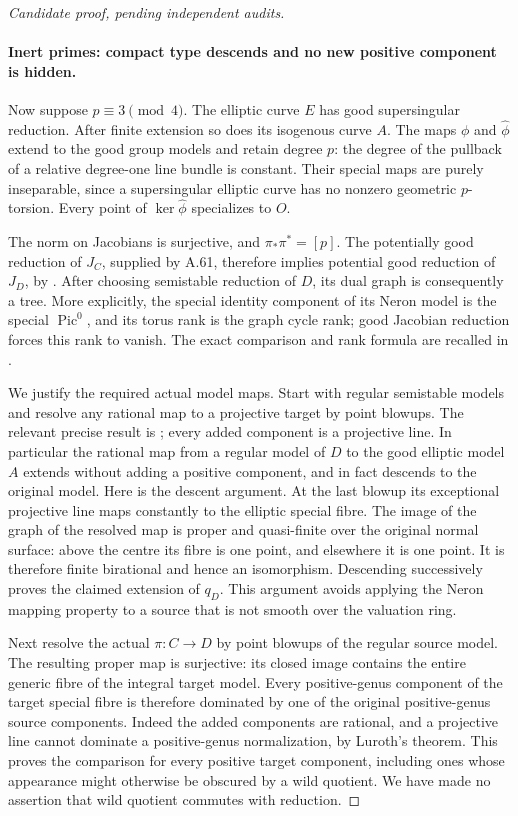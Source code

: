 \begin{proof}[Candidate proof, pending independent audits]
\paragraph{Inert primes: compact type descends and no new positive component is hidden.}
Now suppose \(p\equiv3\pmod4\). The elliptic
curve \(E\) has good supersingular reduction.
After finite extension so does its isogenous
curve \(A\). The maps \(\phi\) and
\(\widehat\phi\) extend to the good group
models and retain degree \(p\): the degree
of the pullback of a relative degree-one
line bundle is constant. Their special maps
are purely inseparable, since a supersingular
elliptic curve has no nonzero geometric
\(p\)-torsion. Every point of
\(\ker\widehat\phi\) specializes to \(O\).

The norm on Jacobians is surjective, and
\(\pi_*\pi^*=[p]\). The potentially good
reduction of \(J_C\), supplied by A.61,
therefore implies potential good reduction
of \(J_D\), by
\cite[Theorem 1 and Corollary 2, p.493]{fghSerreTate1968}.
After choosing semistable reduction of \(D\),
its dual graph is consequently a tree. More
explicitly, the special identity component
of its Neron model is the special \(\operatorname{Pic}^0\),
and its torus rank is the graph cycle rank;
good Jacobian reduction forces this rank to
vanish. The exact comparison and rank formula
are recalled in \cite[Remark 10.4.24 and
Lemma 7.5.18(b)]{fghLiu}.

We justify the required actual model maps.
Start with regular semistable models and
resolve any rational map to a projective
target by point blowups. The relevant precise
result is \cite[Theorem 9.2.7, pp.396--397;
Proposition 9.2.5]{fghLiu}; every added
component is a projective line. In particular
the rational map from a regular model of
\(D\) to the good elliptic model \(A\)
extends without adding a positive component,
and in fact descends to the original model.
Here is the descent argument. At the last
blowup its exceptional projective line maps
constantly to the elliptic special fibre.
The image of the graph of the resolved map
is proper and quasi-finite over the original
normal surface: above the centre its fibre
is one point, and elsewhere it is one point.
It is therefore finite birational and hence
an isomorphism. Descending successively proves
the claimed extension of \(q_D\). This
argument avoids applying the Neron mapping
property to a source that is not smooth
over the valuation ring.

Next resolve the actual \(\pi:C\to D\)
by point blowups of the regular source model.
The resulting proper map is surjective: its
closed image contains the entire generic
fibre of the integral target model. Every
positive-genus component of the target
special fibre is therefore dominated by
one of the original positive-genus source
components. Indeed the added components are
rational, and a projective line cannot
dominate a positive-genus normalization,
by Luroth's theorem. This proves the
comparison for every positive target
component, including ones whose appearance
might otherwise be obscured by a wild quotient.
We have made no assertion that wild quotient
commutes with reduction.


\end{proof}
